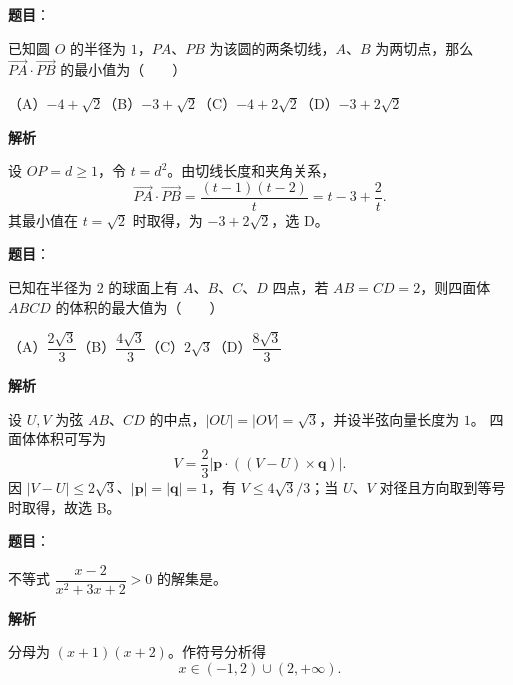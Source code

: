 \begin{answer}

\textbf{题目}：

已知圆 $O$ 的半径为 $1$，$PA\text{、}PB$ 为该圆的两条切线，$A\text{、}B$ 为两切点，那么 $\overrightarrow{PA}\cdot\overrightarrow{PB}$ 的最小值为\mbox{（　　）}

（A）$-4+\sqrt2$\quad（B）$-3+\sqrt2$\quad（C）$-4+2\sqrt2$\quad（D）$-3+2\sqrt2$

\textbf{解析}

设 $OP=d\geq1$，令 $t=d^2$。由切线长度和夹角关系，
\nopagebreak[4]
\[
\overrightarrow{PA}\cdot\overrightarrow{PB}
=\frac{(t-1)(t-2)}t=t-3+\frac2t.
\]
其最小值在 $t=\sqrt2$ 时取得，为 $-3+2\sqrt2$，选 D。


\end{answer}
\begin{answer}

\textbf{题目}：

已知在半径为 $2$ 的球面上有 $A\text{、}B\text{、}C\text{、}D$ 四点，若 $AB=CD=2$，则四面体 $ABCD$ 的体积的最大值为\mbox{（　　）}

（A）$\dfrac{2\sqrt3}{3}$\quad（B）$\dfrac{4\sqrt3}{3}$\quad（C）$2\sqrt3$\quad（D）$\dfrac{8\sqrt3}{3}$

\textbf{解析}

设 $U,V$ 为弦 $AB\text{、}CD$ 的中点，$|OU|=|OV|=\sqrt3$，并设半弦向量长度为 $1$。
四面体体积可写为
\nopagebreak[4]
\[
V=\frac23\left|\boldsymbol p\cdot((V-U)\times\boldsymbol q)\right|.
\]
因 $|V-U|\leq2\sqrt3$、$|\boldsymbol p|=|\boldsymbol q|=1$，有
$V\leq4\sqrt3/3$；当 $U\text{、}V$ 对径且方向取到等号时取得，故选 B。


\end{answer}
\begin{answer}

\textbf{题目}：

不等式 $\dfrac{x-2}{x^2+3x+2}>0$ 的解集是\gkblank{}。

\textbf{解析}

分母为 $(x+1)(x+2)$。作符号分析得
\nopagebreak[4]
\[
x\in(-1,2)\cup(2,+\infty).
\]


\end{answer}
